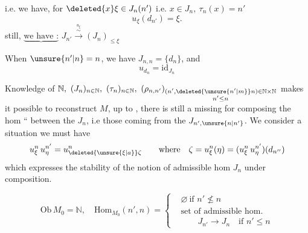 i.e. we have, for \(\deleted{x}\xi\in J_n(n')\) i.e. \(x\in J_n,\ \tau_n(x)=n'\)
\[
 u_\xi(d_{n'})=\xi .
\]
   still, \(\underbrace{\text{we have :}}\)  \(J_{n'}\xrightarrow{\overset{u_\xi}{\sim}}(J_n)_{\leq\xi}\)

When \(\unsure{n'|n}=n\), we have \(J_{n,n}=\{d_n\}\), and
\[
 u_{d_n}=\mathrm{id}_{J_n}
\]

Knowledge of \(\mathbb N,\ (J_n)_{n\in\mathbb N},\ (\tau_n)_{n\in\mathbb N},\
(\rho_{n,n'})_{\substack{(n',\deleted{\unsure{n'|m}}n)\in\mathbb N\times\mathbb N\\ n'\leq n}}\) makes it possible to reconstruct   \(M\), up to  , there is still a   missing for composing the hom `` between the \(J_n\), i.e those coming from the \(J_{n',\unsure{n|n'}}\).  We consider a situation
we must have
\[
 u_\xi^n\,u_\eta^{n'}=u_{\deleted{\unsure{\xi|a}}\zeta}^{n}
 \qquad\text{where}\quad \zeta=u_\xi^n(\eta)=
 (u_\xi^n\,u_\eta^{n'})(d_{n''})
\]
which expresses the  stability of the notion of admissible hom  \(J_n\) under composition.

 
\[
 \mathrm{Ob}\,M_0=\mathbb N,\quad \mathrm{Hom}_{M_0}(n',n)=
 \left\{\begin{aligned}
 &\varnothing\ \text{if }n'\nleq n\\
 &\text{set of admissible hom.}\\
 &\qquad J_{n'}\to J_n\quad\text{if }n'\leq n
 \end{aligned}\right.
\]

